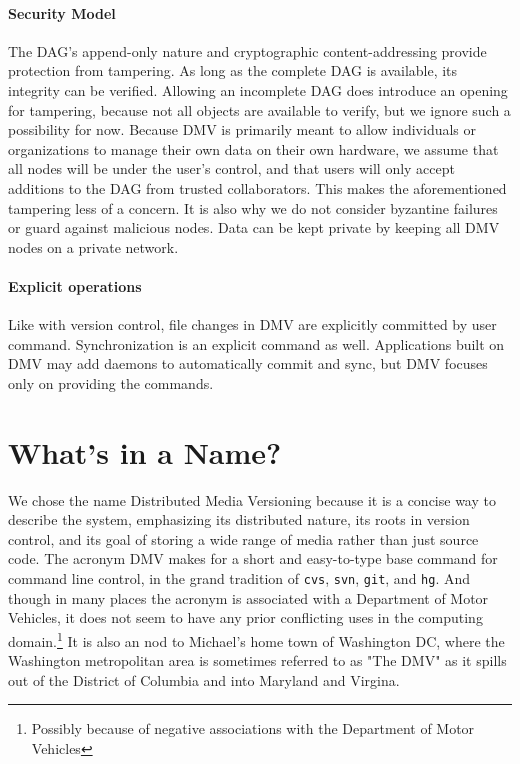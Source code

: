 \paragraph{Security Model}

The DAG's append-only nature and cryptographic content-addressing provide
protection from tampering. As long as the complete DAG is available, its
integrity can be verified. Allowing an incomplete DAG does introduce an opening
for tampering, because not all objects are available to verify, but we ignore
such a possibility for now. Because DMV is primarily meant to allow individuals
or organizations to manage their own data on their own hardware, we assume that
all nodes will be under the user's control, and that users will only accept
additions to the DAG from trusted collaborators. This makes the aforementioned
tampering less of a concern. It is also why we do not consider byzantine
failures or guard against malicious nodes. Data can be kept private by keeping
all DMV nodes on a private network.


\paragraph{Explicit operations}

Like with version control, file changes in DMV are explicitly committed by user
command. Synchronization is an explicit command as well. Applications built on
DMV may add daemons to automatically commit and sync, but DMV focuses only on
providing the commands.


\iffalse
\towrite{Envisioned LS output}

\begin{lstlisting}[float,caption=Example ls output]
    -rw-r--r-- 1 user user  121306 Oct 21 18:28 local   filex
    -rw-r--r-- 1 user user   25475 Oct 21 17:52 100ms   filey
    -rw-r--r-- 1 user user   32031 Oct 21 17:52 20min   filez
    -rw-r--r-- 1 user user   74968 Oct 18 17:12 missing filexx
    -rw-r--r-- 1 user user   83977 Sep 22 21:23 unknown fileyy
\end{lstlisting}
\fi



\section{What's in a Name?}

We chose the name Distributed Media Versioning because it is a concise way to
describe the system, emphasizing its distributed nature, its roots in version
control, and its goal of storing a wide range of media rather than just source
code. The acronym DMV makes for a short and easy-to-type base command for
command line control, in the grand tradition of \lstinline{cvs},
\lstinline{svn}, \lstinline{git}, and \lstinline{hg}. And though in many places
the acronym is associated with a Department of Motor Vehicles, it does not seem
to have any prior conflicting uses in the computing domain.\footnote{Possibly
because of negative associations with the Department of Motor Vehicles} It is
also an nod to Michael's home town of Washington DC, where the Washington
metropolitan area is sometimes referred to as "The DMV" as it spills out of the
District of Columbia and into Maryland and Virgina.
